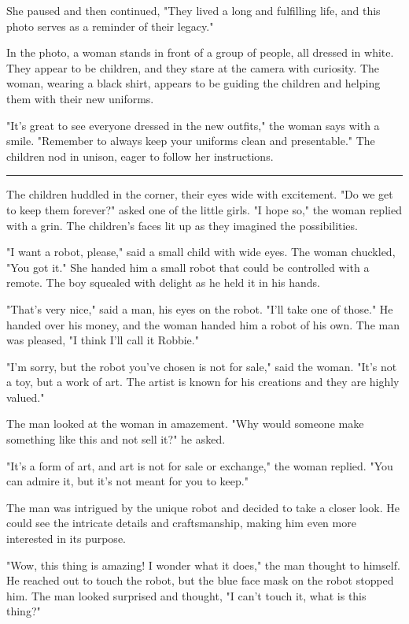 \documentclass[smalldemyvopaper,11pt,twoside,onecolumn,openright,extrafontsizes]{memoir}
\begin{document}
She paused and then continued, "They lived a long and fulfilling life, and this photo serves as a reminder of their legacy."\par
In the photo, a woman stands in front of a group of people, all dressed in white. They appear to be children, and they stare at the camera with curiosity. The woman, wearing a black shirt, appears to be guiding the children and helping them with their new uniforms.\par
"It's great to see everyone dressed in the new outfits," the woman says with a smile. "Remember to always keep your uniforms clean and presentable." The children nod in unison, eager to follow her instructions.\par
\fancybreak{* * *}
The children huddled in the corner, their eyes wide with excitement. "Do we get to keep them forever?" asked one of the little girls. "I hope so," the woman replied with a grin. The children's faces lit up as they imagined the possibilities.\par
"I want a robot, please," said a small child with wide eyes. The woman chuckled, "You got it." She handed him a small robot that could be controlled with a remote. The boy squealed with delight as he held it in his hands.\par
"That's very nice," said a man, his eyes on the robot. "I'll take one of those." He handed over his money, and the woman handed him a robot of his own. The man was pleased, "I think I'll call it Robbie."\par
"I'm sorry, but the robot you've chosen is not for sale," said the woman. "It's not a toy, but a work of art. The artist is known for his creations and they are highly valued."\par
The man looked at the woman in amazement. "Why would someone make something like this and not sell it?" he asked.\par
"It's a form of art, and art is not for sale or exchange," the woman replied. "You can admire it, but it's not meant for you to keep."\par
The man was intrigued by the unique robot and decided to take a closer look. He could see the intricate details and craftsmanship, making him even more interested in its purpose.\par
"Wow, this thing is amazing! I wonder what it does," the man thought to himself. He reached out to touch the robot, but the blue face mask on the robot stopped him. The man looked surprised and thought, "I can't touch it, what is this thing?"\par
\end{document}

